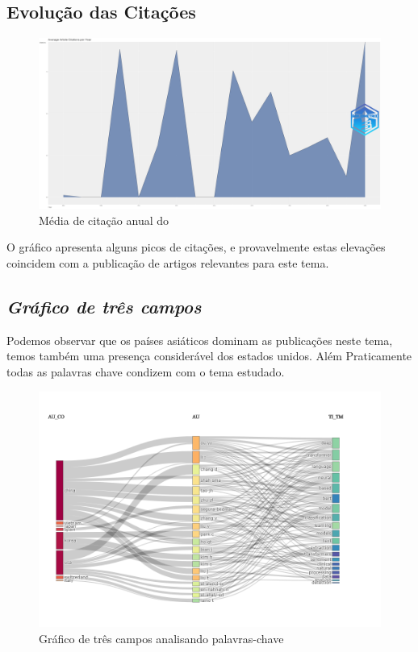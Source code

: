 \subsection{Evolução das Citações}

\begin{figure}[ht]
    \centering
    \includegraphics[width=12cm]{experiments/DanielrCardoso/AnaliseBibliometrica/AverageArticleCitationPerYear-2022-02-10.png}
    \caption{Média de citação anual do \dataset\  }
    \label{fig:citDanielrCardoso}
\end{figure}

O gráfico apresenta alguns picos de citações, e provavelmente estas elevações coincidem com a publicação de artigos relevantes para este tema. 

\subsection{\textit{Gráfico de três campos}}
Podemos observar que os países asiáticos dominam as publicações neste tema, temos também uma presença considerável dos estados unidos. Além Praticamente todas as palavras chave condizem com o tema estudado.

\begin{figure}[ht]
    \centering
    \includegraphics[width=12cm]{experiments/DanielrCardoso/AnaliseBibliometrica/newplot.png}
    \caption{Gráfico de três campos analisando palavras-chave}
    \label{fig:threeDanielrCardoso}
\end{figure}
